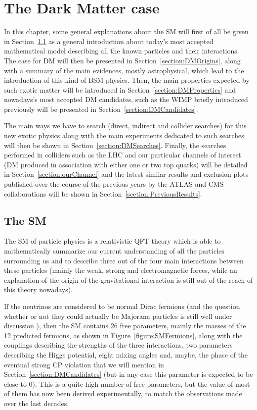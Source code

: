 \documentclass[a4paper, 10pt, openright]{report}
\begin{document}
\chapter{The Dark Matter case}\label{chapter:Case}

In this chapter, some general explanations about the \acf{SM} will first of all be given in Section~\ref{section:SM} as a general introduction about today's most accepted mathematical model describing all the known particles and their interactions. The case for \acf{DM} will then be presented in Section~\ref{section:DMOrigins}, along with a summary of the main evidences, mostly astrophysical, which lead to the introduction of this kind of \acf{BSM} physics. Then, the main properties expected by such exotic matter will be introduced in Section~\ref{section:DMProperties} and nowadays's most accepted \ac{DM} candidates, such as the \acf{WIMP} briefly introduced previously will be presented in Section~\ref{section:DMCandidates}. 

The main ways we have to search (direct, indirect and collider searches) for this new exotic physics along with the main experiments dedicated to such searches will then be shown in Section~\ref{section:DMSearches}. Finally, the searches performed in colliders such as the \acf{LHC} and our particular channels of interest (\ac{DM} produced in association with either one or two top quarks) will be detailed in Section~\ref{section:ourChannel} and the latest similar results and exclusion plots published over the course of the previous years by the \ac{ATLAS} and \ac{CMS} collaborations will be shown in Section~\ref{section:PreviousResults}.

\section{The \acf{SM}} \label{section:SM}

The \acf{SM} of particle physics is a relativistic \ac{QFT} theory which is able to  mathematically summarize our current understanding of all the particles surrounding us and to describe three out of the four main interactions between these particles (mainly the weak, strong and electromagnetic forces, while an explanation of the origin of the gravitational interaction is still out of the reach of this theory nowadays). 

If the neutrinos are considered to be normal Dirac fermions (and the question whether or not they could actually be Majorana particles is still well under discussion \cite{Majorana}), then the \ac{SM} contains 26 free parameters, mainly the masses of the 12 predicted fermions, as shown in Figure~\ref{figure:SMFermions}, along with the couplings describing the strengths of the three interactions, two parameters describing the Higgs potential, eight mixing angles and, maybe, the phase of the eventual strong CP violation that we will mention in Section~\ref{section:DMCandidates} (but in any case this parameter is expected to be close to 0). This is a quite high number of free parameters, but the value of most of them has now been derived experimentally, to match the observations made over the last decades.
\end{document}
